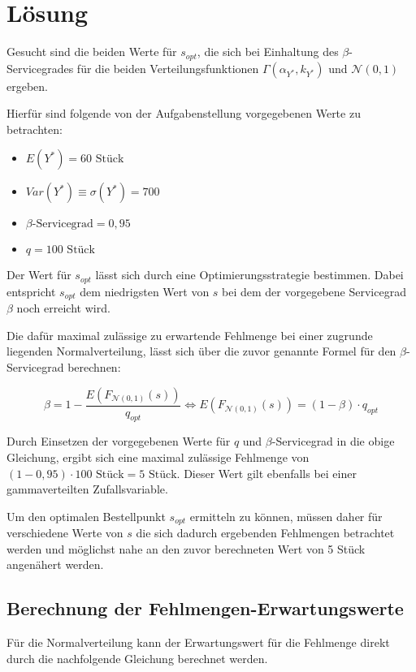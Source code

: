 \section{Lösung}

Gesucht sind die beiden Werte für \(s_{opt}\), die sich bei Einhaltung des \(\beta\)-Servicegrades für die beiden Verteilungsfunktionen \(\Gamma(\alpha_{Y^*},k_{Y^*})\) und \(\mathcal{N}(0,1)\) ergeben.

Hierfür sind folgende von der Aufgabenstellung vorgegebenen Werte zu betrachten:
\begin{itemize}
	\item \(E(Y^*)=60\text{ Stück}\)
	\item \(Var(Y^*)\equiv\sigma(Y^*)=700\)
	\item \(\beta\text{-Servicegrad}=0,95\)
	\item \(q=100\text{ Stück}\) 
\end{itemize}

Der Wert für \(s_{opt}\) lässt sich durch eine Optimierungsstrategie bestimmen. Dabei entspricht \(s_{opt}\) dem niedrigsten Wert von \(s\) bei dem der vorgegebene Servicegrad \(\beta\) noch erreicht wird. 

Die dafür maximal zulässige  zu erwartende Fehlmenge bei einer zugrunde liegenden Normalverteilung, lässt sich über die zuvor genannte Formel für den \(\beta\)-Servicegrad berechnen:

\[\beta = 1-\frac{E\left(F_{\mathcal{N}(0,1)}(s)\right)}{q_{opt}} \Leftrightarrow E\left(F_{\mathcal{N}(0,1)}(s)\right)=(1-\beta)\cdot q_{opt}\]

Durch Einsetzen der vorgegebenen Werte für \(q\) und \(\beta\)-Servicegrad in die obige Gleichung, ergibt sich eine maximal zulässige Fehlmenge von \((1-0,95)\cdot 100 \text{ Stück}=5\text{ Stück}\). Dieser Wert gilt ebenfalls bei einer gammaverteilten Zufallsvariable.

Um den optimalen Bestellpunkt \(s_{opt}\) ermitteln zu können, müssen daher für verschiedene Werte von \(s\) die sich dadurch ergebenden Fehlmengen betrachtet werden und möglichst nahe an den zuvor berechneten Wert von 5 Stück angenähert werden.

\subsection{Berechnung der Fehlmengen-Erwartungswerte}
Für die Normalverteilung kann der Erwartungswert für die Fehlmenge direkt durch die nachfolgende Gleichung berechnet werden. 

